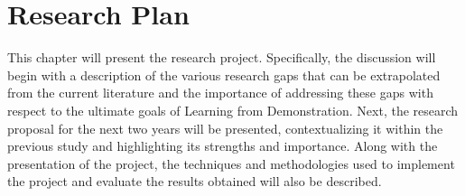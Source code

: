 \chapter{Research Plan}
This chapter will present the research project. Specifically, the discussion will begin with a description of the various research gaps that can be extrapolated from the current literature and the importance of addressing these gaps with respect to the ultimate goals of Learning from Demonstration. Next, the research proposal for the next two years will be presented, contextualizing it within the previous study and highlighting its strengths and importance. Along with the presentation of the project, the techniques and methodologies used to implement the project and evaluate the results obtained will also be described.


